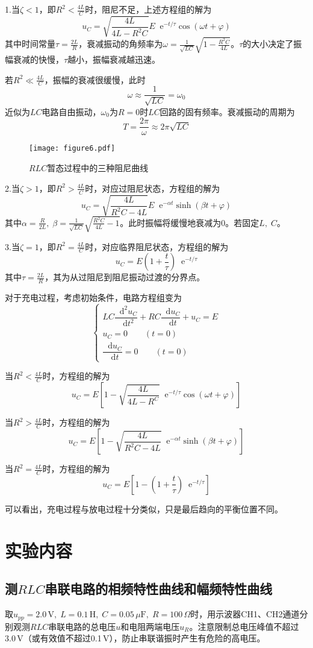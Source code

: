 \documentclass[UTF-8,twoside,cs4size]{ctexart}
\newcommand*{\me}{\mathop{}\!\mathrm{e}}
\newcommand*{\dif}{\mathop{}\!\mathrm{d}}
\begin{document}
	1.当$ \zeta<1 $，即$ R^2<\frac{4L}{C} $时，阻尼不足，上述方程组的解为
	\[u_C=\sqrt{\frac{4L}{4L-R^2C}}E\me^{-t/\tau}\cos(\omega t+\varphi)\]
	其中时间常量$ \tau=\frac{2L}{R} $，衰减振动的角频率为$ \omega=\frac{1}{\sqrt{LC}}\sqrt{1-\frac{R^2C}{4L}} $。$ \tau $的大小决定了振幅衰减的快慢，$ \tau $越小，振幅衰减越迅速。
	
	若$ R^2\ll\frac{4L}{C} $，振幅的衰减很缓慢，此时
	\[\omega\approx\frac{1}{\sqrt{LC}}=\omega_0\]
	近似为$ LC $电路自由振动，$ \omega_0 $为$ R=0 $时$ LC $回路的固有频率。衰减振动的周期为
	\[T=\frac{2\pi}{\omega}\approx2\pi\sqrt{LC}\]
	
	
	\begin{figure}[!h]
		\centering
		\texttt{[image: figure6.pdf]}
		\caption{$ RLC $暂态过程中的三种阻尼曲线}
	\end{figure}
	2.当$ \zeta>1 $，即$ R^2>\frac{4L}{C} $时，对应过阻尼状态，方程组的解为
	\[u_C=\sqrt{\frac{4L}{R^2C-4L}}E\me^{-\alpha t}\sinh(\beta t+\varphi)\]
	其中$ \alpha=\frac{R}{2L},\;\beta=\frac{1}{\sqrt{LC}}\sqrt{\frac{R^2C}{4L}-1} $。此时振幅将缓慢地衰减为0。若固定$ L,\;C $。
	
	3.当$ \zeta=1 $，即$ R^2=\frac{4L}{C} $时，对应临界阻尼状态，方程组的解为
	\[u_C=E\left(1+\frac t\tau\right)\me^{-t/\tau}\]
	其中$ \tau=\frac{2L}{R} $，其为从过阻尼到阻尼振动过渡的分界点。
	
	对于充电过程，考虑初始条件，电路方程组变为
	\[\begin{cases*}
		LC\dfrac{\dif^2u_C}{\dif t^2}+RC\dfrac{\dif u_C}{\dif t}+u_C=E\\
		u_C=0\qquad(t=0)\\
		\dfrac{\dif u_C}{\dif t}=0\qquad(t=0)
	\end{cases*}\]

	当$ R^2<\frac{4L}{C} $时，方程组的解为
	\[u_C=E\left[1-\sqrt{\frac{4L}{4L-R^C}}\me^{-t/\tau}\cos(\omega t+\varphi)\right]\]
	
	当$ R^2>\frac{4L}{C} $时，方程组的解为
	\[u_C=E\left[1-\sqrt{\frac{4L}{R^2C-4L}}\me^{-\alpha t}\sinh(\beta t+\varphi)\right]\]
	
	当$ R^2=\frac{4L}{C} $时，方程组的解为
	\[u_C=E\left[1-\left(1+\frac t\tau\right)\me^{-t/\tau}\right]\]
	
	可以看出，充电过程与放电过程十分类似，只是最后趋向的平衡位置不同。
	
	\section{实验内容}
	\subsection{测$ RLC $串联电路的相频特性曲线和幅频特性曲线}
	取$ u_{pp}=2.0\,\mathrm V,\;L=0.1\,\mathrm H,\;C=0.05\,\mu\mathrm F,\;R=100\,\Omega $时，用示波器CH1、CH2通道分别观测$ RLC $串联电路的总电压$ u $和电阻两端电压$ u_R $。注意限制总电压峰值不超过$ 3.0\,\mathrm V $（或有效值不超过0.1\,V），防止串联谐振时产生有危险的高电压。
	
\end{document}
